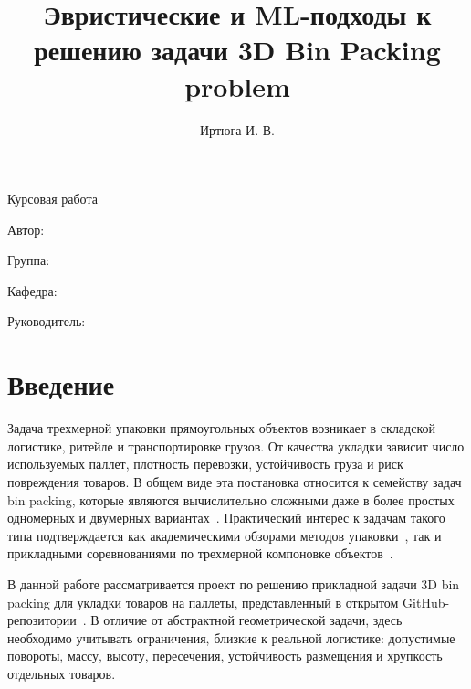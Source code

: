 \documentclass[14pt,a4paper]{extarticle}
\title{Эвристические и ML-подходы к решению задачи 3D Bin Packing problem}
\author{Иртюга И. В.}
\makeatletter
\newif\ifusekprj
\providecommand{\@chair}{}
\providecommand{\@group}{}
\providecommand{\@chief}{}
\providecommand{\@workyear}{\the\year}
\makeatother
\begin{document}
\ifusekprj
  \maketitle
\else
  \begin{titlepage}
    \makeatletter
    \centering
    {\large Курсовая работа\par}
    \vspace{1.5cm}
    {\bfseries\LARGE \@title \par}
    \vspace{1.5cm}
    {\large Автор: \@author\par}
    \vspace{0.5cm}
    {\large Группа: \@group\par}
    \vspace{0.5cm}
    {\large Кафедра: \@chair\par}
    \vspace{0.5cm}
    {\large Руководитель: \@chief\par}
    \vfill
    {\large \@workyear\par}
    \makeatother
  \end{titlepage}
\fi
\tableofcontents
\pagebreak

\section{Введение}

Задача трехмерной упаковки прямоугольных объектов возникает в складской логистике, ритейле и транспортировке грузов. От качества укладки зависит число используемых паллет, плотность перевозки, устойчивость груза и риск повреждения товаров. В общем виде эта постановка относится к семейству задач bin packing, которые являются вычислительно сложными даже в более простых одномерных и двумерных вариантах~\cite{wiki_bin_packing,martello2000}. Практический интерес к задачам такого типа подтверждается как академическими обзорами методов упаковки~\cite{isa2016}, так и прикладными соревнованиями по трехмерной компоновке объектов~\cite{kaggle_sleigh}.

В данной работе рассматривается проект по решению прикладной задачи 3D bin packing для укладки товаров на паллеты, представленный в открытом GitHub-репозитории~\cite{project_repo}. В отличие от абстрактной геометрической задачи, здесь необходимо учитывать ограничения, близкие к реальной логистике: допустимые повороты, массу, высоту, пересечения, устойчивость размещения и хрупкость отдельных товаров.
\end{document}
